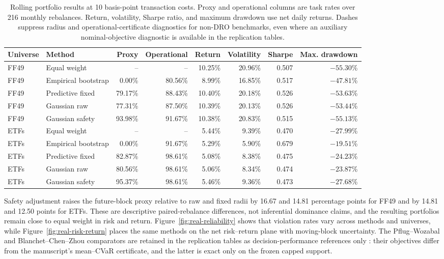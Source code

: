 \documentclass[11pt]{article}
\newcommand{\1}{\mathbf{1}}
\begin{document}
\begin{table}[H]
\centering
\caption{Rolling portfolio results at 10 basis-point transaction costs.  Proxy and operational columns are task rates over 216 monthly rebalances.  Return, volatility, Sharpe ratio, and maximum drawdown use net daily returns.  Dashes suppress radius and operational-certificate diagnostics for non-DRO benchmarks, even where an auxiliary nominal-objective diagnostic is available in the replication tables.}
\label{tab:real-results}
\footnotesize
\setlength{\tabcolsep}{2.6pt}
\begin{tabular}{@{}llrrrrrr@{}}
\toprule
Universe & Method & Proxy & Operational & Return & Volatility & Sharpe & Max. drawdown \\
\midrule
FF49 & Equal weight & -- & -- & 10.25\% & 20.96\% & 0.507 & $-55.30$\% \\
FF49 & Empirical bootstrap & 0.00\% & 80.56\% & 8.99\% & 16.85\% & 0.517 & $-47.81$\% \\
FF49 & Predictive fixed & 79.17\% & 88.43\% & 10.40\% & 20.18\% & 0.526 & $-53.63$\% \\
FF49 & Gaussian raw & 77.31\% & 87.50\% & 10.39\% & 20.13\% & 0.526 & $-53.44$\% \\
FF49 & Gaussian safety & 93.98\% & 91.67\% & 10.38\% & 20.83\% & 0.515 & $-55.13$\% \\
\addlinespace
ETFs & Equal weight & -- & -- & 5.44\% & 9.39\% & 0.470 & $-27.99$\% \\
ETFs & Empirical bootstrap & 0.00\% & 91.67\% & 5.29\% & 5.90\% & 0.679 & $-19.51$\% \\
ETFs & Predictive fixed & 82.87\% & 98.61\% & 5.08\% & 8.38\% & 0.475 & $-24.23$\% \\
ETFs & Gaussian raw & 80.56\% & 98.61\% & 5.06\% & 8.34\% & 0.474 & $-23.87$\% \\
ETFs & Gaussian safety & 95.37\% & 98.61\% & 5.46\% & 9.36\% & 0.473 & $-27.68$\% \\
\bottomrule
\end{tabular}
\end{table}

Safety adjustment raises the future-block proxy relative to raw and fixed radii by 16.67 and 14.81 percentage points for FF49 and by 14.81 and 12.50 points for ETFs.  These are descriptive paired-rebalance differences, not inferential dominance claims, and the resulting portfolios remain close to equal weight in risk and return.  Figure~\ref{fig:real-reliability} shows that violation rates vary across methods and universes, while Figure~\ref{fig:real-risk-return} places the same methods on the net risk--return plane with moving-block uncertainty.  The Pflug--Wozabal and Blanchet--Chen--Zhou comparators are retained in the replication tables as decision-performance references only \citep{pflug2007ambiguity,blanchet2022portfolio}: their objectives differ from the manuscript's mean--CVaR certificate, and the latter is exact only on the frozen capped support.
\end{document}
